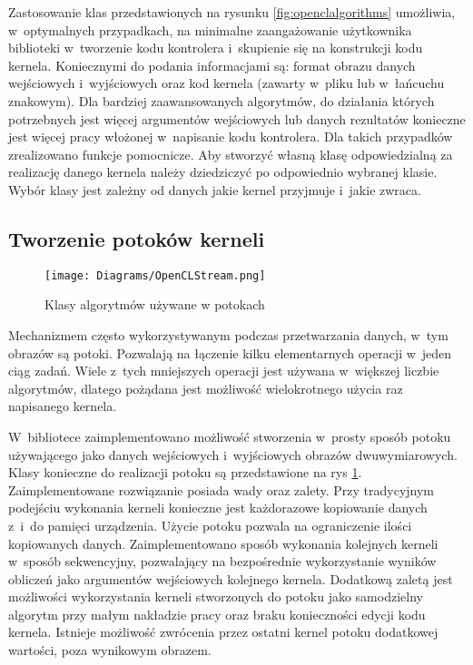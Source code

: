 Zastosowanie klas przedstawionych na rysunku \ref{fig:openclalgorithms} umożliwia, w~optymalnych przypadkach, na minimalne zaangażowanie użytkownika biblioteki w~tworzenie kodu kontrolera i~skupienie się na konstrukcji kodu kernela. Koniecznymi do podania informacjami są: format obrazu danych wejściowych i~wyjściowych oraz kod kernela (zawarty w~pliku lub w~łańcuchu znakowym). Dla bardziej zaawansowanych algorytmów, do działania których potrzebnych jest więcej argumentów wejściowych lub danych rezultatów konieczne jest więcej pracy włożonej w~napisanie kodu kontrolera. Dla takich przypadków zrealizowano funkcje pomocnicze. Aby stworzyć własną klasę odpowiedzialną za realizację danego kernela należy dziedziczyć po odpowiednio wybranej klasie. Wybór klasy jest zależny od danych jakie kernel przyjmuje i~jakie zwraca.

\subsection{Tworzenie potoków kerneli}
\label{subsec:potokikerneli}

\begin{figure}
\begin{center}
\texttt{[image: Diagrams/OpenCLStream.png]}
\end{center}
\caption{Klasy algorytmów używane w potokach}
\label{fig:diagrampotok}
\end{figure}

Mechanizmem często wykorzystywanym podczas przetwarzania danych, w~tym obrazów są potoki. Pozwalają na łączenie kilku elementarnych operacji w~jeden ciąg zadań. Wiele z~tych mniejszych operacji jest używana w~większej liczbie algorytmów, dlatego pożądana jest możliwość wielokrotnego użycia raz napisanego kernela.

W~bibliotece zaimplementowano możliwość stworzenia w~prosty sposób potoku używającego jako danych wejściowych i~wyjściowych obrazów dwuwymiarowych. Klasy konieczne do realizacji potoku są przedstawione na rys \ref{fig:diagrampotok}. Zaimplementowane rozwiązanie posiada wady oraz zalety. Przy tradycyjnym podejściu wykonania kerneli konieczne jest każdorazowe kopiowanie danych z~i~do pamięci urządzenia. Użycie potoku pozwala na ograniczenie ilości kopiowanych danych. Zaimplementowano sposób wykonania kolejnych kerneli w~sposób sekwencyjny, pozwalający na bezpośrednie wykorzystanie wyników obliczeń jako argumentów wejściowych kolejnego kernela. Dodatkową zaletą jest możliwości wykorzystania kerneli stworzonych do potoku jako samodzielny algorytm przy małym nakładzie pracy oraz braku konieczności edycji kodu kernela. Istnieje możliwość zwrócenia przez ostatni kernel potoku dodatkowej wartości, poza wynikowym obrazem.

